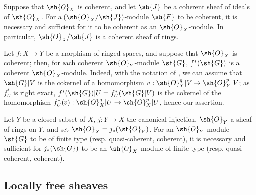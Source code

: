 \begin{env}[5.3.10]
\label{0.5.3.10}
Suppose that $\sh{O}_X$ is coherent, and let $\sh{J}$ be a coherent sheaf of ideals of $\sh{O}_X$.
For a $(\sh{O}_X/\sh{J})$-module $\sh{F}$ to be coherent, it is necessary and sufficient for it to be coherent as an $\sh{O}_X$-module.
In particular, $\sh{O}_X/\sh{J}$ is a coherent sheaf of rings.
\end{env}

\begin{env}[5.3.11]
\label{0.5.3.11}
Let $f:X\to Y$ be a morphism of ringed spaces, and suppose that $\sh{O}_X$ is coherent;
then, for each coherent $\sh{O}_Y$-module $\sh{G}$, $f^*(\sh{G})$ is a coherent $\sh{O}_X$-module.
Indeed, with the notation of , we can assume that $\sh{G}|V$ is the cokernel of a homomorphism $v:\sh{O}_Y^q|V\to\sh{O}_Y^p|V$;
as $f_U^*$ is right exact, $f^*(\sh{G})|U=f_U^*(\sh{G}|V)$ is the cokernel of the homomorphism $f_U^*(v):\sh{O}_X^q|U\to\sh{O}_X^p|U$, hence our assertion.
\end{env}

\begin{env}[5.3.12]
\label{0.5.3.12}
Let $Y$ be a closed subset of $X$, $j:Y\to X$ the canonical injection, $\sh{O}_Y$ a sheaf of rings on $Y$, and set $\sh{O}_X=j_*(\sh{O}_Y)$.
For an $\sh{O}_Y$-module $\sh{G}$ to be of finite type (resp. quasi-coherent, coherent), it is necessary and sufficient for $j_*(\sh{G})$ to be an $\sh{O}_X$-module of finite type (resp. quasi-coherent, coherent).
\end{env}

\subsection{Locally free sheaves}
\label{subsection:0.5.4}

